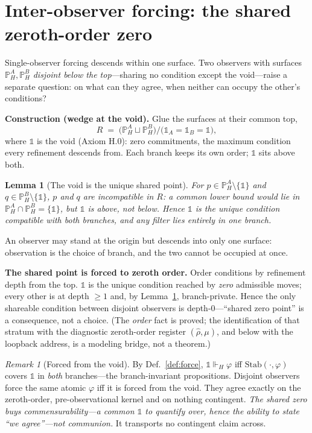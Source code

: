 \documentclass[11pt]{article}
\newtheorem{lemma}{Lemma}
\theoremstyle{definition}
\theoremstyle{remark}
\newtheorem*{remark}{Remark}
\newcommand{\forcesH}{\Vdash_{H}}
\newcommand{\PH}{\mathbb{P}_{H}}
\newcommand{\Stab}{\mathrm{Stab}}
\begin{document}
\section{Inter-observer forcing: the shared zeroth-order zero}\label{sec:void}

Single-observer forcing descends within one surface. Two observers with surfaces $\PH^A,\PH^B$
\emph{disjoint below the top}---sharing no condition except the void---raise a separate question: on
what can they agree, when neither can occupy the other's conditions?

\medskip\noindent\textbf{Construction (wedge at the void).} Glue the surfaces at their common top,
\[
  R \;=\; \bigl(\PH^A \sqcup \PH^B\bigr)\big/\bigl(\mathbb{1}_A=\mathbb{1}_B=\mathbb{1}\bigr),
\]
where $\mathbb{1}$ is the void (Axiom H.0): zero commitments, the maximum condition every refinement
descends from. Each branch keeps its own order; $\mathbb{1}$ sits above both.

\begin{lemma}[The void is the unique shared point]\label{lem:void}
For $p\in\PH^A\setminus\{\mathbb{1}\}$ and $q\in\PH^B\setminus\{\mathbb{1}\}$, $p$ and $q$ are
incompatible in $R$: a common lower bound would lie in $\PH^A\cap\PH^B=\{\mathbb{1}\}$, but
$\mathbb{1}$ is above, not below. Hence $\mathbb{1}$ is the unique condition compatible with both
branches, and any filter lies entirely in one branch.
\end{lemma}

An observer may stand at the origin but descends into only one surface: observation is the choice of
branch, and the two cannot be occupied at once.

\medskip\noindent\textbf{The shared point is forced to zeroth order.} Order conditions by refinement
depth from the top. $\mathbb{1}$ is the unique condition reached by \emph{zero} admissible moves;
every other is at depth $\ge 1$ and, by Lemma~\ref{lem:void}, branch-private. Hence the only shareable
condition between disjoint observers is depth-$0$---``shared zero point'' is a consequence, not a
choice. (The \emph{order} fact is proved; the identification of that stratum with the diagnostic
zeroth-order register $(\hat\rho,\mu)$, and below with the loopback address, is a modeling bridge, not
a theorem.)

\begin{remark}[Forced from the void]
By Def.~\ref{def:force}, $\mathbb{1}\forcesH\varphi$ iff $\Stab(\cdot,\varphi)$ covers $\mathbb{1}$ in
\emph{both} branches---the branch-invariant propositions. Disjoint observers force the same atomic
$\varphi$ iff it is forced from the void. They agree exactly on the zeroth-order, pre-observational
kernel and on nothing contingent. \emph{The shared zero buys commensurability---a common $\mathbb{1}$
to quantify over, hence the ability to state ``we agree''---not communion.} It transports no contingent
claim across.
\end{remark}
\end{document}

